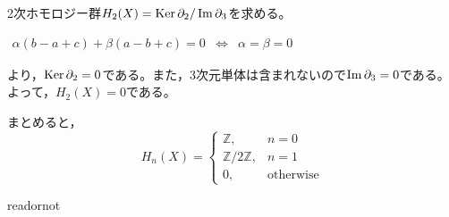 \documentclass[uplatex]{jsarticle}
\begin{document}
\begin{rei}[射影平面のホモロジー群]
	2次ホモロジー群$H_{2}(X) = \operatorname{Ker} \partial_{2} / \operatorname{Im} \partial_{3}$を求める。
	\begin{center}
		$\begin{array}{lcl}
			\alpha (b-a+c) + \beta (a-b+c) = 0 & \Longleftrightarrow & \alpha = \beta = 0
		\end{array}$
	\end{center}
	\renewcommand{\arraystretch}{1.3}
	より，$\operatorname{Ker} \partial_{2} = 0$である。また，3次元単体は含まれないので$\operatorname{Im} \partial_{3} = 0$である。
	よって，$H_{2} (X) = 0$である。

	まとめると，
	\begin{equation}
		H_{n}(X) = \begin{cases}
			\mathbb{Z}, & n=0 \\
			\mathbb{Z} / 2 \mathbb{Z}, & n=1 \\
			0, & \text{otherwise}
		\end{cases}
	\end{equation}
\end{rei}

	

\expandafter\ifx\csname readornot\endcsname\relax
  
\end{document}
